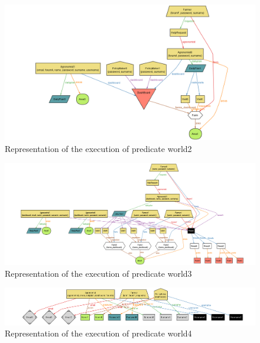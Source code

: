\newpage

\begin{figure}[H]
	\centering
	\includegraphics[angle=90, scale=0.5]{Images/world2.png}
	\caption{Representation of the execution of predicate world2}
\end{figure}

\newpage

\begin{figure}[H]
	\centering
	\includegraphics[angle=90, scale=0.47]{Images/world3.png}
	\caption{Representation of the execution of predicate world3}
\end{figure}

\newpage

\begin{figure}[H]
	\centering
	\includegraphics[angle=90, scale=0.43]{Images/world4.png}
	\caption{Representation of the execution of predicate world4}
\end{figure}